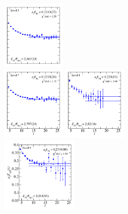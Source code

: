 \begin{figure}
  \includegraphics[width=0.28\textwidth]{figures/spectrum_a1g/with_tq/fits/fit_5.pdf}\\
  \includegraphics[width=0.28\textwidth]{figures/spectrum_a1g/with_tq/fits/fit_6.pdf}
  \includegraphics[width=0.28\textwidth]{figures/spectrum_a1g/with_tq/fits/fit_7.pdf}\\[-0.4cm]
  \includegraphics[width=0.336\textwidth]{figures/spectrum_a1g/with_tq/fits/fit_9.pdf}

\end{figure}
